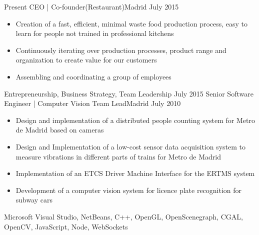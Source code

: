 %
%
%
%


\begin{experiences}
  \experience
    {Present}   {CEO | Co-founder}{(Restaurant)}{Madrid}
    {July 2015} {
                      \begin{itemize}
                        \item Creation of a fast, efficient, minimal waste food production process, easy to learn for people not trained in professional kitchens
                        \item Continuously iterating over production processes, product range and organization to create value for our customers
                        \item Assembling and coordinating a group of employees
                      \end{itemize}
                }
                {Entrepreneurship, Business Strategy, Team Leadership}
  \emptySeparator
  \experience
    {July 2015} {Senior Software Engineer | Computer Vision Team Lead}{}{Madrid}
    {July 2010}    {
                      \begin{itemize}
                        \item Design and implementation of a distributed people counting system for Metro de Madrid based on cameras
                        \item Design and Implementation of a low-cost sensor data acquisition system to measure vibrations in different parts of trains for Metro de Madrid
                        \item Implementation of an ETCS Driver Machine Interface for the ERTMS system
                        \item Development of a computer vision system for licence plate recognition for subway cars
                      \end{itemize}
                    }
                    {Microsoft Visual Studio, NetBeans, C++, OpenGL, OpenScenegraph, CGAL, OpenCV, JavaScript, Node, WebSockets}

\end{experiences}
